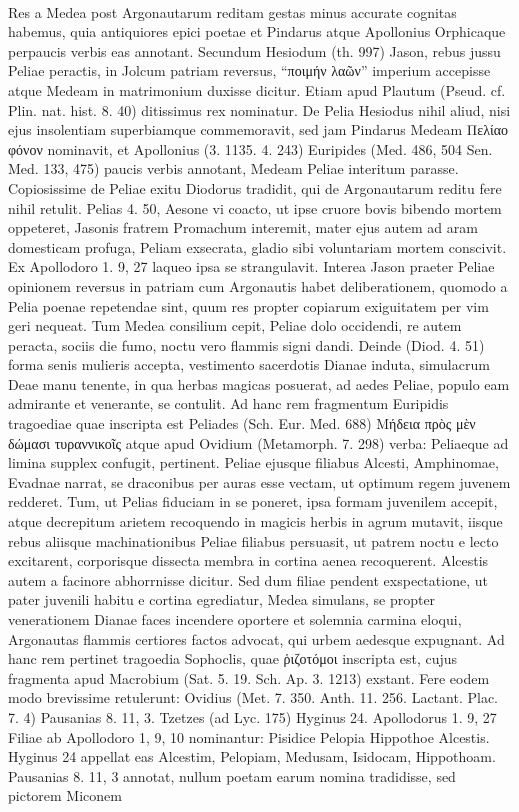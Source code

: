 \documentclass[landscape, a4paper, 11pt, oneside, polutonikogreek, german]{article}
\begin{document}
\paragraph{}
Res a Medea post Argonautarum reditam gestas minus accurate cognitas habemus, quia antiquiores epici poetae et Pindarus atque Apollonius Orphicaque perpaucis verbis eas annotant. Secundum Hesiodum (th. 997) Jason, rebus jussu Peliae peractis, in Jolcum patriam reversus, "`ποιμήν λαῶν"' imperium accepisse atque Medeam in matrimonium duxisse dicitur. Etiam apud Plautum (Pseud. cf. Plin. nat. hist. 8. 40) ditissimus rex nominatur. De Pelia Hesiodus nihil aliud, nisi ejus insolentiam superbiamque commemoravit, sed jam Pindarus Medeam Πελίαο φόνον nominavit, et Apollonius (3. 1135. 4. 243) Euripides (Med. 486, 504 Sen. Med. 133, 475) paucis verbis annotant, Medeam Peliae interitum parasse. Copiosissime de Peliae exitu Diodorus tradidit, qui de Argonautarum reditu fere nihil retulit. Pelias 4. 50, Aesone vi coacto, ut ipse cruore bovis bibendo mortem oppeteret, Jasonis fratrem Promachum interemit, mater ejus autem ad aram domesticam profuga, Peliam exsecrata, gladio sibi voluntariam mortem conscivit. Ex Apollodoro 1. 9, 27 laqueo ipsa se strangulavit. Interea Jason praeter Peliae opinionem reversus in patriam cum Argonautis habet deliberationem, quomodo a Pelia poenae repetendae sint, quum res propter copiarum exiguitatem per vim geri nequeat. Tum Medea consilium cepit, Peliae dolo occidendi, re autem peracta, sociis die fumo, noctu vero flammis signi dandi. Deinde (Diod. 4. 51) forma senis mulieris accepta, vestimento sacerdotis Dianae induta, simulacrum Deae manu tenente, in qua herbas magicas posuerat, ad aedes Peliae, populo eam admirante et venerante, se contulit. Ad hanc rem fragmentum Euripidis tragoediae quae inscripta est Peliades (Sch. Eur. Med. 688) Μήδεια πρὸς μὲν δώμασι τυραννικοῖς atque apud Ovidium (Metamorph. 7. 298) verba: Peliaeque ad limina supplex confugit, pertinent. Peliae ejusque filiabus Alcesti, Amphinomae, Evadnae narrat, se draconibus per auras esse vectam, ut optimum regem juvenem redderet. Tum, ut Pelias fiduciam in se poneret, ipsa formam juvenilem accepit, atque decrepitum arietem recoquendo in magicis herbis in agrum mutavit, iisque rebus aliisque machinationibus Peliae filiabus persuasit, ut patrem noctu e lecto excitarent, corporisque dissecta membra in cortina aenea recoquerent. Alcestis autem a facinore abhorrnisse dicitur. Sed dum filiae pendent exspectatione, ut pater juvenili habitu e cortina egrediatur, Medea simulans, se propter venerationem Dianae faces incendere oportere et solemnia carmina eloqui, Argonautas flammis certiores factos advocat, qui urbem aedesque expugnant. Ad hanc rem pertinet tragoedia Sophoclis, quae ῥιζοτόμοι inscripta est, cujus fragmenta apud Macrobium (Sat. 5. 19. Sch. Ap. 3. 1213) exstant. Fere eodem modo brevissime retulerunt: Ovidius (Met. 7. 350. Anth. 11. 256. Lactant. Plac. 7. 4) Pausanias 8. 11, 3. Tzetzes (ad Lyc. 175) Hyginus 24. Apollodorus 1. 9, 27 Filiae ab Apollodoro 1, 9, 10 nominantur: Pisidice Pelopia Hippothoe Alcestis. Hyginus 24 appellat eas Alcestim, Pelopiam, Medusam, Isidocam, Hippothoam. Pausanias 8. 11, 3 annotat, nullum poetam earum nomina tradidisse, sed pictorem Miconem 
\end{document}
